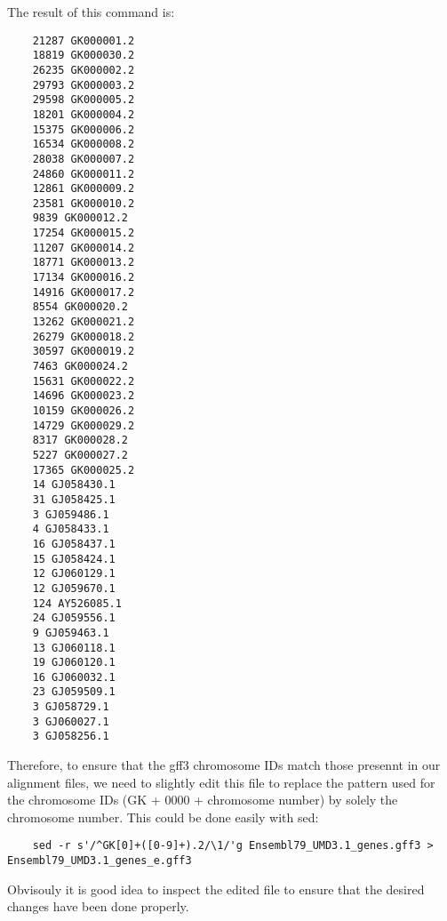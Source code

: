 The result of this command is:
\begin{verbatim}
	21287 GK000001.2
	18819 GK000030.2
	26235 GK000002.2
	29793 GK000003.2
	29598 GK000005.2
	18201 GK000004.2
	15375 GK000006.2
	16534 GK000008.2
	28038 GK000007.2
	24860 GK000011.2
	12861 GK000009.2
	23581 GK000010.2
	9839 GK000012.2
	17254 GK000015.2
	11207 GK000014.2
	18771 GK000013.2
	17134 GK000016.2
	14916 GK000017.2
	8554 GK000020.2
	13262 GK000021.2
	26279 GK000018.2
	30597 GK000019.2
	7463 GK000024.2
	15631 GK000022.2
	14696 GK000023.2
	10159 GK000026.2
	14729 GK000029.2
	8317 GK000028.2
	5227 GK000027.2
	17365 GK000025.2
	14 GJ058430.1
	31 GJ058425.1
	3 GJ059486.1
	4 GJ058433.1
	16 GJ058437.1
	15 GJ058424.1
	12 GJ060129.1
	12 GJ059670.1
	124 AY526085.1
	24 GJ059556.1
	9 GJ059463.1
	13 GJ060118.1
	19 GJ060120.1
	16 GJ060032.1
	23 GJ059509.1
	3 GJ058729.1
	3 GJ060027.1
	3 GJ058256.1
\end{verbatim}

Therefore, to ensure that the gff3 chromosome IDs match those presennt in our alignment files, we need to slightly edit this file to replace the pattern used for the chromosome IDs (GK + 0000 + chromosome number) by solely the chromosome number. This could be done easily with sed:

\begin{verbatim}
	sed -r s'/^GK[0]+([0-9]+).2/\1/'g Ensembl79_UMD3.1_genes.gff3 > Ensembl79_UMD3.1_genes_e.gff3
\end{verbatim}

Obvisouly it is good idea to inspect the edited file to ensure that the desired changes have been done properly.



